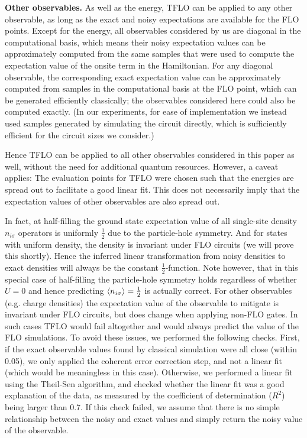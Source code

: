 \documentclass[aps,prb,twoside,superscriptaddress,longbibliography,nofootinbib,floatfix, notitlepage,twocolumn]{revtex4-1}
\begin{document}
{\textbf{Other observables.} As well as the energy, TFLO can be applied to any other 
observable, as long as the exact and noisy expectations are available for the FLO points.
Except for the energy, all observables considered by us are diagonal in the 
computational basis, which means their noisy expectation values can be approximately computed from the 
same samples that were used to compute the expectation value of the onsite term in the 
Hamiltonian. For any diagonal observable, the corresponding exact expectation value can be approximately computed from samples in the computational basis at the FLO point, which can be generated efficiently classically\cite{terhal02}; the observables considered here could also be computed exactly. (In our experiments, for ease of implementation we instead used samples generated by simulating the circuit directly, which is sufficiently efficient for the circuit sizes we consider.)

Hence TFLO can be applied to all other observables considered in this paper
as well, without the need for additional quantum resources.
However, a caveat applies: The evaluation points for TFLO were chosen such that 
the  energies are spread out to facilitate a good linear fit. This does not
necessarily imply that the expectation values of other observables are also spread 
out.

In fact, at half-filling the ground state expectation value of all single-site density
$n_{i\sigma}$ operators is uniformly $\frac{1}{2}$ due to the particle-hole
symmetry. And for states with uniform density, the density is invariant under FLO circuits 
(we will prove this shortly).
Hence the inferred linear transformation from noisy densities to exact densities will
always be the constant $\frac{1}{2}$-function. Note however, that in this special case 
of half-filling the particle-hole symmetry holds regardless of whether $U=0$ and hence
predicting $\braket{n_{i\sigma}} = \frac{1}{2}$ is actually correct. For other observables (e.g. charge densities) 
the expectation value of the observable to mitigate is invariant under FLO circuits, but does change when applying non-FLO gates. In such cases TFLO would fail altogether and would always predict the value of the FLO simulations. To avoid these issues, we performed the following checks. First, if the exact observable values found by classical simulation were all close (within 0.05), we only applied the coherent error correction step, and not a linear fit (which would be meaningless in this case). Otherwise, we performed a linear fit using the Theil-Sen algorithm, and checked whether the linear fit was a good explanation of the data, as measured by the coefficient of determination ($R^2$) being larger than 0.7. If this check failed, we assume that there is no simple relationship between the noisy and exact values and simply return the noisy value of the observable.

}
\end{document}
